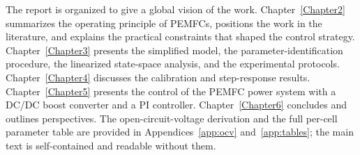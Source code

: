 The report is organized to give a global vision of the work.
Chapter~\ref{Chapter2} summarizes the operating principle of PEMFCs, positions the
work in the literature, and explains the practical constraints that shaped the
control strategy. Chapter~\ref{Chapter3} presents the simplified model, the
parameter-identification procedure, the linearized state-space analysis, and the
experimental protocols. Chapter~\ref{Chapter4} discusses the calibration and
step-response results. Chapter~\ref{Chapter5} presents the control of the PEMFC
power system with a DC/DC boost converter and a PI controller.
Chapter~\ref{Chapter6} concludes and outlines perspectives. The
open-circuit-voltage derivation and the full per-cell parameter table are provided
in Appendices~\ref{app:ocv} and~\ref{app:tables}; the main text is self-contained
and readable without them.

